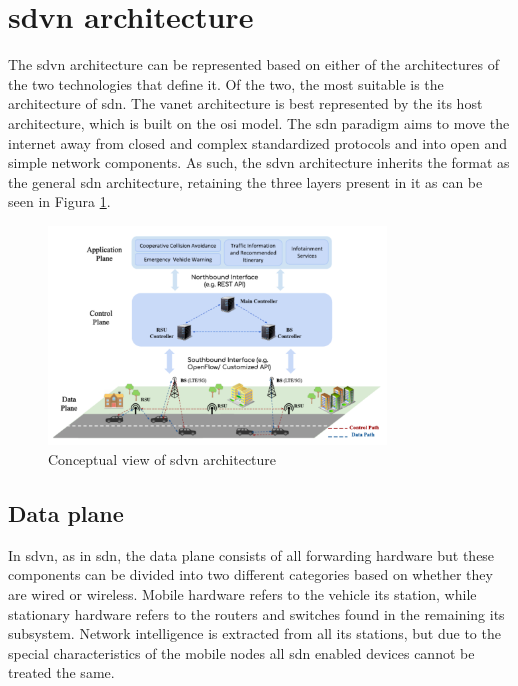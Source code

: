 \section[SDVN architecture]{\gls{sdvn} architecture}

The \gls{sdvn} architecture can be represented based on either of the architectures of the two technologies that define it. Of the two, the most suitable is the architecture of \gls{sdn}. The \gls{vanet} architecture is best represented by the \gls{its} host architecture, which is built on the \gls{osi} model. The \gls{sdn} paradigm aims to move the internet away from closed and complex standardized protocols and into open and simple network components. As such, the \gls{sdvn} architecture inherits the format as the general \gls{sdn} architecture, retaining the three layers present in it as can be seen in Figura \ref{fig:sdvn_arciotecture}. 

\begin{figure}
	\centering
	\includegraphics[width=0.8\textwidth]{Chapters/Figures/SDVNs/architecture.png}
	\caption{Conceptual view of \gls{sdvn} architecture\cite{toufga_towards_2020}}
	\label{fig:sdvn_arciotecture}
\end{figure}

\subsection{Data plane}

In \gls{sdvn}, as in \gls{sdn}, the data plane consists of all forwarding hardware but these components can be divided into two different categories based on whether they are wired or wireless. Mobile hardware refers to the vehicle \gls{its} station, while stationary hardware refers to the routers and switches found in the remaining \gls{its} subsystem. Network intelligence is extracted from all \gls{its} stations, but due to the special characteristics of the mobile nodes all \gls{sdn} enabled devices cannot be treated the same. 

